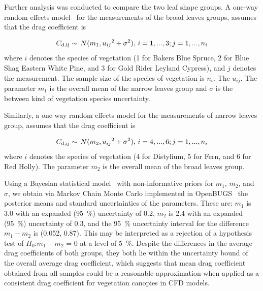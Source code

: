 \documentclass[12pt]{article}
\begin{document}
Further analysis was conducted to compare the two leaf shape groups. A one-way random effects model~\cite{Toman2009} for the measurements of the broad leaves groups, assumes that the drag coefficient is

\begin{equation}
\label{eq:NarrowLeavesDragCoefficient}
C_{\rm d,ij}\sim\,N(m_{1},{u_{ij}}^2+{\sigma}^2),\, i = 1,...,3; j = 1,...,n_{i}
\end{equation} 
where $i$ denotes the species of vegetation (1 for Bakers Blue Spruce, 2 for Blue Shag Eastern White Pine, and 3 for Gold Rider Leyland Cypress), and $j$ denotes the measurement. The sample size of the species of vegetation is $n_{i}$. The $u_{ij}$. The parameter $m_{1}$ is the overall mean of the narrow leaves group and $\sigma$ is the between kind of vegetation species uncertainty. 

Similarly, a one-way random effects model for the measurements of narrow leaves group, assumes that the drag coefficient is

\begin{equation}
\label{eq:BroadLeavesDragCoefficient}
C_{\rm d,ij}\sim\,N(m_{2},{u_{ij}}^2+{\sigma}^2),\, i = 4,...,6; j = 1,...,n_{i}
\end{equation} 
where $i$ denotes the species of vegetation (4 for Distylium, 5 for Fern, and 6 for Red Holly). The parameter $m_{2}$ is the overall mean of the broad leaves group.

Using a Bayesian statistical model~\cite{Gelman2008} with non-informative priors for $m_{1}$, $m_{2}$, and $\sigma$, we obtain via Markov Chain Monte Carlo implemented in OpenBUGS~\cite{Lunn2009} the posterior means and standard uncertainties of the parameters. These are: $m_{1}$ is 3.0 with an expanded (95~\%) uncertainty of 0.2, $m_{2}$ is 2.4 with an expanded (95~\%) uncertainty of 0.3, and the 95~\% uncertainty interval for the difference $m_{1}-m_{2}$ is (0.052, 0.87). This may be interpreted as a rejection of a hypothesis test of $H_{0}$:$m_{1}-m_{2}$ = 0 at a level of 5~\%. Despite the differences in the average drag coefficients of both groups, they both lie within the uncertainty bound of the overall average drag coefficient, which suggests that mean drag coefficient obtained from all samples could be a reasonable approximation when applied as a consistent drag coefficient for vegetation canopies in CFD models. 
\end{document}
